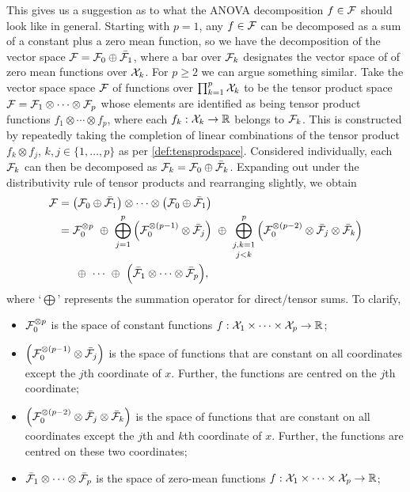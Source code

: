 This gives us a suggestion as to what the ANOVA decomposition $f \in {\mathcal F}$ should look like in general.
Starting with $p=1$, any $f \in {\mathcal F}$ can be decomposed as a sum of a constant plus a zero mean function, so we have the
decomposition of the vector space ${\mathcal F} = {\mathcal F}_0 \oplus \bar{{\mathcal F}}_1$, where 
a bar over ${\mathcal F}_k$ designates the vector space of of zero mean functions over ${\mathcal X}_k$.
For $p\geq 2$ we can argue something similar.
Take the vector space space ${\mathcal F}$ of functions over $\prod_{k=1}^p {\mathcal X}_k$ to be the tensor product space ${\mathcal F} = {\mathcal F}_1 \otimes \cdots \otimes {\mathcal F}_p$ whose elements are identified as being tensor product functions $f_1 \otimes\cdots\otimes f_p$, where each $f_k:{\mathcal X}_k\to\mathbb{R}$ belongs to ${\mathcal F}_k$.
This is constructed by repeatedly taking the completion of linear combinations of the tensor product $f_k \otimes f_j$, $k,j\in\{1,\dots,p\}$ as per \cref{def:tensprodspace}.
Considered individually, each ${\mathcal F}_k$ can then be decomposed as ${\mathcal F}_k = {\mathcal F}_{0} \oplus \bar{{\mathcal F}}_k$.
Expanding out under the distributivity rule of tensor products and rearranging slightly, we obtain
\begin{align}
  \cF &= \big( \cF_0 \oplus \bar\cF_1 \big) \otimes \cdots \otimes 
  \big( \cF_0 \oplus \bar\cF_1 \big) \nonumber \\
  &= \cF_{0}^{\otimes p} 
  \ \oplus \
  \bigoplus_{j=1}^p %
  \Big( \cF_0^{\otimes (p-1)} \otimes \bar\cF_j \Big) 
  \ \oplus \
  \mathop{\bigoplus_{j,k=1}^p}_{j<k} %
  \Big( \cF_0^{\otimes (p-2)} \otimes \bar\cF_j \otimes \bar\cF_k \Big)
  \label{eq:funcanovaspace} \\
  &\phantom{==} \oplus \ 
  \cdots 
  \ \oplus \ 
  \Big( \bar\cF_1 \otimes \cdots \otimes \bar\cF_p \Big), \nonumber
\end{align}
where `$\bigoplus$' represents the summation operator for direct/tensor sums. 
To clarify,
\begin{itemize}
  \item ${\mathcal F}_{0}^{\otimes p}$ is the space of constant functions $f:{\mathcal X}_1\times\cdots\times{\mathcal X}_p\to\mathbb{R}$;
  \item $\Big( {\mathcal F}_0^{\otimes (p-1)} \otimes \bar{{\mathcal F}}_j \Big)$ is the space of functions that are constant on all coordinates except the $j$th coordinate of $x$. Further, the functions are centred on the $j$th coordinate;
  \item $\Big( {\mathcal F}_0^{\otimes (p-2)} \otimes \bar{{\mathcal F}}_j \otimes \bar{{\mathcal F}}_k \Big)$ is the space of functions that are constant on all coordinates except the $j$th and $k$th coordinate of $x$. Further, the functions are centred on these two coordinates;
  \item $\bar{{\mathcal F}}_1 \otimes \cdots \otimes \bar{{\mathcal F}}_p$ is the space of zero-mean functions $f:{\mathcal X}_1\times\cdots\times{\mathcal X}_p\to\mathbb{R}$;
\end{itemize}
